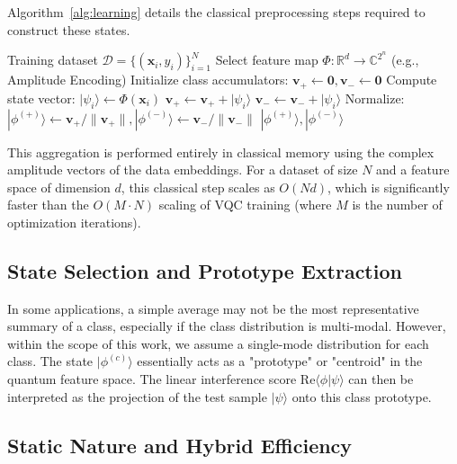 \documentclass[conference]{IEEEtran}
\begin{document}
Algorithm~\ref{alg:learning} details the classical preprocessing steps required to construct these states.

\begin{algorithm}[ht]
\caption{Static Learning of Class-Representative States}
\label{alg:learning}
\begin{algorithmic}[1]
\REQUIRE Training dataset $\mathcal{D} = \{(\mathbf{x}_i, y_i)\}_{i=1}^N$
\STATE Select feature map $\Phi: \mathbb{R}^d \rightarrow \mathbb{C}^{2^n}$ (e.g., Amplitude Encoding)
\STATE Initialize class accumulators: $\mathbf{v}_+ \leftarrow \mathbf{0}, \mathbf{v}_- \leftarrow \mathbf{0}$
    \STATE Compute state vector: $|\psi_i\rangle \leftarrow \Phi(\mathbf{x}_i)$
        \STATE $\mathbf{v}_+ \leftarrow \mathbf{v}_+ + |\psi_i\rangle$
    \ELSE
        \STATE $\mathbf{v}_- \leftarrow \mathbf{v}_- + |\psi_i\rangle$
    \ENDIF
\ENDFOR
\STATE Normalize: $|\phi^{(+)}\rangle \leftarrow \mathbf{v}_+/\|\mathbf{v}_+\|, |\phi^{(-)}\rangle \leftarrow \mathbf{v}_-/\|\mathbf{v}_-\|$
\RETURN $|\phi^{(+)}\rangle, |\phi^{(-)}\rangle$
\end{algorithmic}
\end{algorithm}

This aggregation is performed entirely in classical memory using the complex amplitude vectors of the data embeddings. For a dataset of size $N$ and a feature space of dimension $d$, this classical step scales as $O(Nd)$, which is significantly faster than the $O(M \cdot N)$ scaling of VQC training (where $M$ is the number of optimization iterations).

\subsection{State Selection and Prototype Extraction}

In some applications, a simple average may not be the most representative summary of a class, especially if the class distribution is multi-modal. However, within the scope of this work, we assume a single-mode distribution for each class. The state $|\phi^{(c)}\rangle$ essentially acts as a "prototype" or "centroid" in the quantum feature space. The linear interference score $\text{Re}\langle \phi | \psi \rangle$ can then be interpreted as the projection of the test sample $|\psi\rangle$ onto this class prototype. 

\subsection{Static Nature and Hybrid Efficiency}
\end{document}
